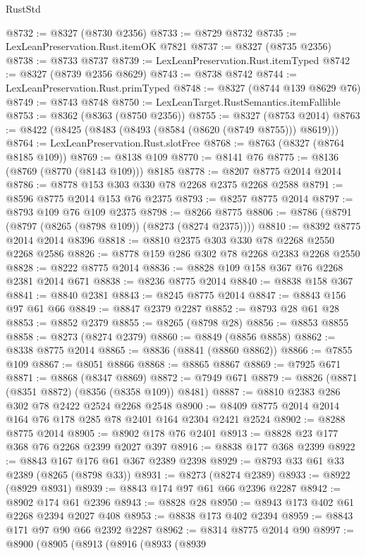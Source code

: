 \begin{lexlean}{RustStd}
\begin{coremodule}
{\begin{coremodule}
{{{{{{{{{{{{{{{{{{{{{{{{{{{{{{{{{{{{{{{{{{{{{{{{{{{{{{@8732 := @8327 (@8730 @2356)
@8733 := @8729 @8732
@8735 := LexLeanPreservation.Rust.itemOK @7821
@8737 := @8327 (@8735 @2356)
@8738 := @8733 @8737
@8739 := LexLeanPreservation.Rust.itemTyped
@8742 := @8327 (@8739 @2356 @8629)
@8743 := @8738 @8742
@8744 := LexLeanPreservation.Rust.primTyped
@8748 := @8327 (@8744 @139 @8629 @76)
@8749 := @8743 @8748
@8750 := LexLeanTarget.RustSemantics.itemFallible
@8753 := @8362 (@8363 (@8750 @2356))
@8755 := @8327 (@8753 @2014)
@8763 := @8422 (@8425 (@8483 (@8493 (@8584 (@8620 (@8749 @8755))) @8619)))
@8764 := LexLeanPreservation.Rust.slotFree
@8768 := @8763 (@8327 (@8764 @8185 @109))
@8769 := @8138 @109
@8770 := @8141 @76
@8775 := @8136 (@8769 (@8770 (@8143 @109))) @8185
@8778 := @8207 @8775 @2014 @2014
@8786 := @8778 @153 @303 @330 @78 @2268 @2375 @2268 @2588
@8791 := @8596 @8775 @2014 @153 @76 @2375
@8793 := @8257 @8775 @2014
@8797 := @8793 @109 @76 @109 @2375
@8798 := @8266 @8775
@8806 := @8786 (@8791 (@8797 (@8265 (@8798 @109)) (@8273 (@8274 @2375))))
@8810 := @8392 @8775 @2014 @2014 @8396
@8818 := @8810 @2375 @303 @330 @78 @2268 @2550 @2268 @2586
@8826 := @8778 @159 @286 @302 @78 @2268 @2383 @2268 @2550
@8828 := @8222 @8775 @2014
@8836 := @8828 @109 @158 @367 @76 @2268 @2381 @2014 @671
@8838 := @8236 @8775 @2014
@8840 := @8838 @158 @367
@8841 := @8840 @2381
@8843 := @8245 @8775 @2014
@8847 := @8843 @156 @97 @61 @66
@8849 := @8847 @2379 @2287
@8852 := @8793 @28 @61 @28
@8853 := @8852 @2379
@8855 := @8265 (@8798 @28)
@8856 := @8853 @8855
@8858 := @8273 (@8274 @2379)
@8860 := @8849 (@8856 @8858)
@8862 := @8338 @8775 @2014
@8865 := @8836 (@8841 (@8860 @8862))
@8866 := @7855 @109
@8867 := @8051 @8866
@8868 := @8865 @8867
@8869 := @7925 @671
@8871 := @8868 (@8347 @8869)
@8872 := @7949 @671
@8879 := @8826 (@8871 (@8351 @8872) (@8356 (@8358 @109)) @8481)
@8887 := @8810 @2383 @286 @302 @78 @2422 @2524 @2268 @2548
@8900 := @8409 @8775 @2014 @2014 @164 @76 @178 @285 @78 @2401 @164 @2304 @2421 @2524
@8902 := @8288 @8775 @2014
@8905 := @8902 @178 @76 @2401
@8913 := @8828 @23 @177 @368 @76 @2268 @2399 @2027 @397
@8916 := @8838 @177 @368 @2399
@8922 := @8843 @167 @176 @61 @367 @2389 @2398
@8929 := @8793 @33 @61 @33 @2389 (@8265 (@8798 @33))
@8931 := @8273 (@8274 @2389)
@8933 := @8922 (@8929 @8931)
@8939 := @8843 @174 @97 @61 @66 @2396 @2287
@8942 := @8902 @174 @61 @2396
@8943 := @8828 @28
@8950 := @8943 @173 @402 @61 @2268 @2394 @2027 @408
@8953 := @8838 @173 @402 @2394
@8959 := @8843 @171 @97 @90 @66 @2392 @2287
@8962 := @8314 @8775 @2014 @90
@8997 := @8900
    (@8905
      (@8913
        (@8916
          (@8933
            (@8939
}}}}}}}}}}}}}}}}}}}}}}}}}}}}}}}}}}}}}}}}}}}}}}}}}}}}}}
\end{coremodule}}
\end{coremodule}
\end{lexlean}
